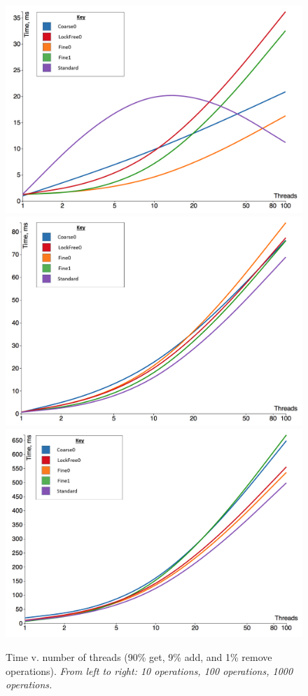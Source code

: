 \documentclass[12pt,oneline,a4paper]{ouparticle}
\begin{document}
\begin{figure}
    \centering
    \hspace*{-2.25cm}
    \includegraphics[width=0.37\linewidth]{7}\hspace{0em}
    \includegraphics[width=0.37\linewidth]{8}\hspace{0em}
    \includegraphics[width=0.37\linewidth]{9}
    \hspace*{-2.25cm}
    \centering
    \caption{Time v. number of threads (90\% get, 9\% add, and 1\% remove operations).\newline{}
    {\it From left to right: 10 operations, 100 operations, 1000 operations.}}
    \label{fig:g3}
\end{figure}
\end{document}
